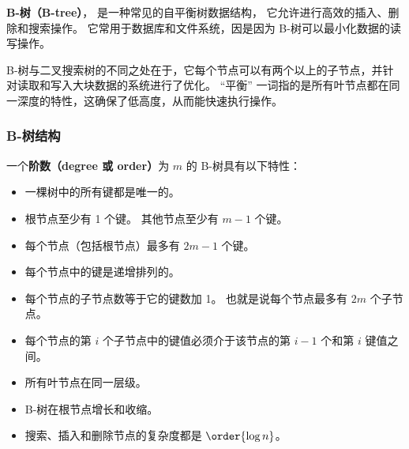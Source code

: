 
\begin{issues}
\issueDraft
\issueAi
\end{issues}


\textbf{B-树（B-tree）}， 是一种常见的自平衡树数据结构， 它允许进行高效的插入、删除和搜索操作。 它常用于数据库和文件系统，因是因为 B-树可以最小化数据的读写操作。

B-树与二叉搜索树的不同之处在于，它每个节点可以有两个以上的子节点，并针对读取和写入大块数据的系统进行了优化。 “平衡” 一词指的是所有叶节点都在同一深度的特性，这确保了低高度，从而能快速执行操作。


\subsubsection{B-树结构}
一个\textbf{阶数（degree 或 order）}为 $m$ 的 B-树具有以下特性：
\begin{itemize}
\item 一棵树中的所有键都是唯一的。
\item 根节点至少有 1 个键。 其他节点至少有 $m-1$ 个键。
\item 每个节点（包括根节点）最多有 $2m-1$ 个键。
\item 每个节点中的键是递增排列的。
\item 每个节点的子节点数等于它的键数加 1。 也就是说每个节点最多有 $2m$ 个子节点。
\item 每个节点的第 $i$ 个子节点中的键值必须介于该节点的第 $i-1$ 个和第 $i$ 键值之间。
\item 所有叶节点在同一层级。
\item B-树在根节点增长和收缩。
\item 搜索、插入和删除节点的复杂度都是 $\order{\log n}$。
\end{itemize}

